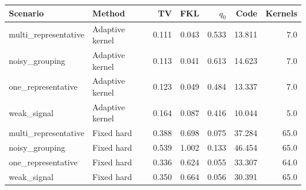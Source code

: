 \begin{tabular}{llrrrrr}
\toprule
Scenario & Method & TV & FKL & $q_0$ & Code & Kernels \\
\midrule
multi\_representative & Adaptive kernel & 0.111 & 0.043 & 0.533 & 13.811 & 7.0 \\
noisy\_grouping & Adaptive kernel & 0.113 & 0.041 & 0.613 & 14.623 & 7.0 \\
one\_representative & Adaptive kernel & 0.123 & 0.049 & 0.484 & 13.337 & 7.0 \\
weak\_signal & Adaptive kernel & 0.164 & 0.087 & 0.416 & 10.044 & 5.0 \\
multi\_representative & Fixed hard & 0.388 & 0.698 & 0.075 & 37.284 & 65.0 \\
noisy\_grouping & Fixed hard & 0.539 & 1.002 & 0.133 & 46.454 & 65.0 \\
one\_representative & Fixed hard & 0.336 & 0.624 & 0.055 & 33.307 & 64.0 \\
weak\_signal & Fixed hard & 0.350 & 0.664 & 0.056 & 30.391 & 65.0 \\
\bottomrule
\end{tabular}
